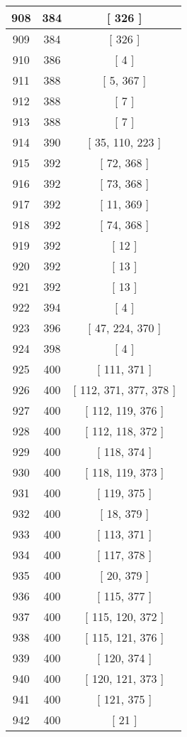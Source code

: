 \begin{center}
\begin{longtable}[H]{|| c c c ||}
908 & 384 & [ 326 ] \\ 
\hline
909 & 384 & [ 326 ] \\ 
\hline
910 & 386 & [ 4 ] \\ 
\hline
911 & 388 & [ 5, 367 ] \\ 
\hline
912 & 388 & [ 7 ] \\ 
\hline
913 & 388 & [ 7 ] \\ 
\hline
914 & 390 & [ 35, 110, 223 ] \\ 
\hline
915 & 392 & [ 72, 368 ] \\ 
\hline
916 & 392 & [ 73, 368 ] \\ 
\hline
917 & 392 & [ 11, 369 ] \\ 
\hline
918 & 392 & [ 74, 368 ] \\ 
\hline
919 & 392 & [ 12 ] \\ 
\hline
920 & 392 & [ 13 ] \\ 
\hline
921 & 392 & [ 13 ] \\ 
\hline
922 & 394 & [ 4 ] \\ 
\hline
923 & 396 & [ 47, 224, 370 ] \\ 
\hline
924 & 398 & [ 4 ] \\ 
\hline
925 & 400 & [ 111, 371 ] \\ 
\hline
926 & 400 & [ 112, 371, 377, 378 ] \\ 
\hline
927 & 400 & [ 112, 119, 376 ] \\ 
\hline
928 & 400 & [ 112, 118, 372 ] \\ 
\hline
929 & 400 & [ 118, 374 ] \\ 
\hline
930 & 400 & [ 118, 119, 373 ] \\ 
\hline
931 & 400 & [ 119, 375 ] \\ 
\hline
932 & 400 & [ 18, 379 ] \\ 
\hline
933 & 400 & [ 113, 371 ] \\ 
\hline
934 & 400 & [ 117, 378 ] \\ 
\hline
935 & 400 & [ 20, 379 ] \\ 
\hline
936 & 400 & [ 115, 377 ] \\ 
\hline
937 & 400 & [ 115, 120, 372 ] \\ 
\hline
938 & 400 & [ 115, 121, 376 ] \\ 
\hline
939 & 400 & [ 120, 374 ] \\ 
\hline
940 & 400 & [ 120, 121, 373 ] \\ 
\hline
941 & 400 & [ 121, 375 ] \\ 
\hline
942 & 400 & [ 21 ] \\ 

\end{longtable}
\end{center}
